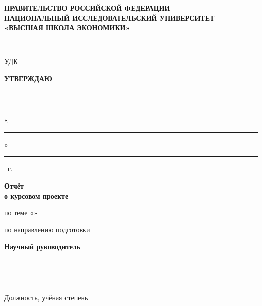 \begin{titlepage}
\thispagestyle{empty}
\singlespacing
\setlength{\parindent}{0pt}
\setlength{\parskip}{0pt}

\begin{center}
\textbf{ПРАВИТЕЛЬСТВО РОССИЙСКОЙ ФЕДЕРАЦИИ}\\
\textbf{НАЦИОНАЛЬНЫЙ ИССЛЕДОВАТЕЛЬСКИЙ УНИВЕРСИТЕТ}\\
\textbf{«ВЫСШАЯ ШКОЛА ЭКОНОМИКИ»}

\vspace{0.3cm}
\hseFaculty\\
\hseDepartment
\end{center}

\vspace{0.6cm}
\noindent
\begin{minipage}[t]{0.42\textwidth}
\raggedright
УДК~\hseUDC
\end{minipage}
\hfill
\begin{minipage}[t]{0.52\textwidth}
\raggedright
\textbf{УТВЕРЖДАЮ}\\
\hseAcademicSupervisorTitle

\vspace{0.4cm}
\rule{3.6cm}{0.4pt}~\hseAcademicSupervisorName

\vspace{0.2cm}
«\rule{0.8cm}{0.4pt}» \rule{2.8cm}{0.4pt} \hseYear~г.
\end{minipage}

\vspace{2.2cm}
\begin{center}
{\large\textbf{Отчёт}}\\[0.15cm]
{\large\textbf{о курсовом проекте}}

\vspace{0.5cm}
по теме «\hseProjectName»

\vspace{0.3cm}
по направлению подготовки \hseProgramCode
\end{center}

\vfill
\noindent
\begin{minipage}[t]{0.46\textwidth}
\raggedright
\textbf{Научный руководитель}\\[0.2cm]
\strut\hseSupervisorTitle\ifdefempty{\hseSupervisorDegree}{}{, \hseSupervisorDegree}\\[-0.1cm]
\rule{6cm}{0.4pt}\\[-0.1cm]
{\scriptsize Должность, учёная степень}


\end{minipage}
\end{titlepage}
